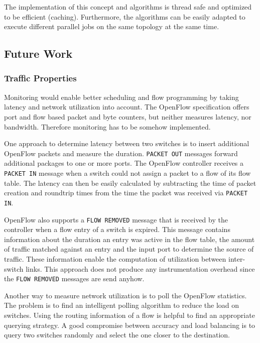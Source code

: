 The implementation of this concept and algorithms is thread safe and optimized to be efficient
(caching). Furthermore, the algorithms can be easily adapted to execute different parallel jobs on
the same topology at the same time.

\subsection{Future Work}
\subsubsection{Traffic Properties}
Monitoring would enable better scheduling and flow programming by taking latency and network
utilization into account. The OpenFlow specification \cite{openflow} offers port and flow based
packet and byte counters, but neither measures latency, nor bandwidth. Therefore monitoring has to
be somehow implemented.

One approach to determine latency between two switches is to insert additional OpenFlow packets and
measure the duration.  \texttt{PACKET OUT} messages forward additional packages to one or more
ports.  The OpenFlow controller receives a \texttt{PACKET IN} message when a switch could not assign
a packet to a flow of its flow table. The latency can then be easily calculated by subtracting the
time of packet creation and roundtrip times from the time the packet was received via \texttt{PACKET
IN}. \cite{monitoringlatency} \cite{opennetmon}

OpenFlow also supports a \texttt{FLOW REMOVED} message that is received by the controller when a
flow entry of a switch is expired. This message contains information about the duration an entry
was active in the flow table, the amount of traffic matched against an entry and the input port to
determine the source of traffic.  These information enable the computation of utilization between
inter-switch links. This approach does not produce any instrumentation overhead since the
\texttt{FLOW REMOVED} messages are send anyhow. \cite{flowsense}

Another way to measure network utilization is to poll the OpenFlow statistics. The problem is to
find an intelligent polling algorithm to reduce the load on switches. Using the routing information
of a flow is helpful to find an appropriate querying strategy.  A good compromise between accuracy
and load balancing is to query two switches randomly and select the one closer to the destination.
\cite{opentm} \cite{opennetmon}

